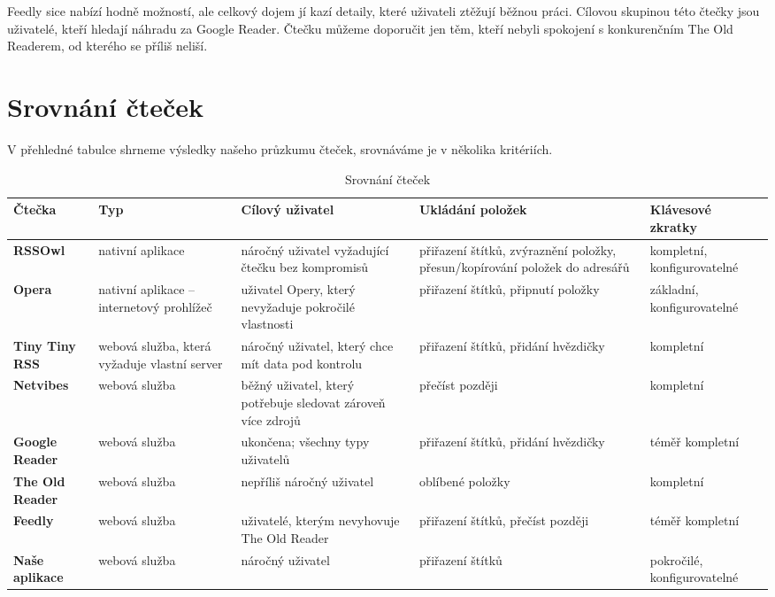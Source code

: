 Feedly sice nabízí hodně možností, ale celkový dojem jí kazí detaily, které uživateli ztěžují běžnou práci.
Cílovou skupinou této čtečky jsou uživatelé, kteří hledají náhradu za Google Reader.
Čtečku můžeme doporučit jen těm, kteří nebyli spokojení s konkurenčním The Old Readerem, od kterého se příliš neliší.

\section{Srovnání čteček}

V přehledné tabulce shrneme výsledky našeho průzkumu čteček, srovnáváme je v několika kritériích.

\begin{sidewaystable}
		\caption{Srovnání čteček}
		\tabulinesep=8pt 
		\begin{tabu} {| X[-1.5,l,p] || X[-1.5,l,p] | X[-2,l,p] | X[-2,l,p] | X[-1.2,l,p] |}
			\rowfont{\bfseries}
			\hline
			Čtečka & 
			Typ & 
			Cílový uživatel & 
			Ukládání položek &
			Klávesové zkratky \\ 
			\hline
			\hline
			\textbf{RSSOwl} & 
			nativní aplikace & 
			náročný uživatel vyžadující čtečku bez kompromisů & 
			přiřazení štítků, zvýraznění položky, přesun/kopírování položek do adresářů &
			kompletní, konfigurovatelné \\
			\hline
			\textbf{Opera} & 
			nativní aplikace -- internetový prohlížeč & 
			uživatel Opery, který nevyžaduje pokročilé vlastnosti & 
			přiřazení štítků, připnutí položky & 
			základní, konfigurovatelné \\
			\hline
			\textbf{Tiny Tiny RSS} & 
			webová služba, která vyžaduje vlastní server & 
			náročný uživatel, který chce mít data pod kontrolu & 
			přiřazení štítků, přidání hvězdičky &
			kompletní \\
			\hline
			\textbf{Netvibes} &
			webová služba &
			běžný uživatel, který potřebuje sledovat zároveň více zdrojů &
			přečíst později &
			kompletní \\
			\hline
			\textbf{Google Reader} &
			webová služba & 
			ukončena; všechny typy uživatelů & 
			přiřazení štítků, přidání hvězdičky &
			téměř kompletní \\
			\hline
			\textbf{The Old Reader} & 
			webová služba & 
			nepříliš náročný uživatel & 
			oblíbené položky &
			kompletní \\
			\hline
			\textbf{Feedly} & 
			webová služba & 
			uživatelé, kterým nevyhovuje The Old Reader & 
			přiřazení štítků, přečíst později &
			téměř kompletní \\
			\hline
			\hline
			\textbf{Naše aplikace} &
			webová služba &
			náročný uživatel &
			přiřazení štítků &
			pokročilé, konfigurovatelné \\
			\hline
		\end{tabu}
\end{sidewaystable}
